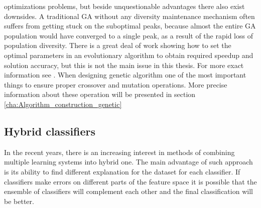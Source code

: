 optimizations problems, but beside unquestionable advantages there also exist downsides. 
A traditional GA without any diversity maintenance mechanism often suffers from getting 
stuck on the suboptimal peaks, because almost the entire GA population would have converged 
to a single peak, as a result of the rapid loss of population diversity. 
There is a great deal of work showing how to set the optimal parameters in an evolutionary 
algorithm to obtain required speedup and solution accuracy, but this is not the main issue 
in this thesis. For more exact information see .
When designing genetic algorithm one of the most important things to ensure proper crossover 
and mutation operations. More precise information about these operation will be
presented in section \ref{cha:Algorithm_construction_genetic}

\subsection{Hybrid classifiers}
\label{cha:Hybrid_classifiers}
In the recent years, there is an increasing interest in methods of combining
multiple learning systems into hybrid one. The main advantage of such approach
is its ability to find different explanation for the dataset for each
classifier. If classifiers make errors on different parts of the feature space
it is possible that the ensemble of classifiers will complement each other and
the final classification will be better. 

